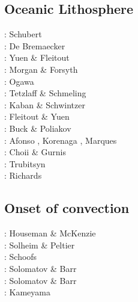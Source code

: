 \subsection{Oceanic Lithosphere}

\begin{scriptsize}
\nineteenseventysix: Schubert \etal \cite{scfy76}\\
\nineteenseventyseven: De Bremaecker \cite{debr77}\\
\nineteeneightyfour: Yuen \& Fleitout \cite{yufl84}\\
\nineteeneightyeight: Morgan \& Forsyth \cite{mofo88}\\
\nineteenninety: Ogawa \cite{ogaw90} \\
\twothousand: Tetzlaff \& Schmeling \cite{tesc00}\\
\twothousandone: Kaban \& Schwintzer \cite{kasc01}\\
\nineteeneightyfour: Fleitout \& Yuen \cite{flyu84} \\
\nineteenninetyeight: Buck \& Poliakov \cite{bupo98}\\
\twothousandseven: Afonso \etal \cite{afrf07}, Korenaga \cite{kore07}, Marques \etal \cite{macl07}\\
\twothousandeight: Choii \& Gurnis \cite{chgu08}\\
\twothousandtwelve: Trubitsyn \cite{trub12} \\
\twothousandeighteen: Richards \etal \cite{rihc18}
\end{scriptsize}

\subsection{Onset of convection}

\begin{scriptsize}
\noindent
\nineteeneightytwo: Houseman \& McKenzie \cite{homc82}\\
\nineteenninety: Solheim \& Peltier \cite{sope90}\\
\twothousand: Schoofs \etal \cite{scth00}\\
\twothousandsix: Solomatov \& Barr \cite{soba06}\\
\twothousandseven: Solomatov \& Barr \cite{soba07}\\
\twothousandfifteen: Kameyama \etal \cite{kamo15}
\end{scriptsize}

